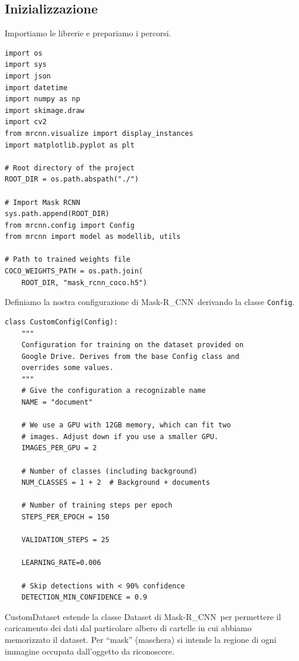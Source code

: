 \documentclass[12pt,a4paper]{article}
\newcommand{\mrcnn}{Mask-R\_CNN}
\begin{document}
\subsection{Inizializzazione}

Importiamo le librerie e prepariamo i percorsi.

\begin{verbatim}
import os
import sys
import json
import datetime
import numpy as np
import skimage.draw
import cv2
from mrcnn.visualize import display_instances
import matplotlib.pyplot as plt

# Root directory of the project
ROOT_DIR = os.path.abspath("./")

# Import Mask RCNN
sys.path.append(ROOT_DIR)
from mrcnn.config import Config
from mrcnn import model as modellib, utils

# Path to trained weights file
COCO_WEIGHTS_PATH = os.path.join(
    ROOT_DIR, "mask_rcnn_coco.h5")
\end{verbatim}

Definiamo la nostra configurazione di \mrcnn\ derivando la classe
\texttt{Config}.

\begin{verbatim}
class CustomConfig(Config):
    """
    Configuration for training on the dataset provided on
    Google Drive. Derives from the base Config class and
    overrides some values.
    """
    # Give the configuration a recognizable name
    NAME = "document"

    # We use a GPU with 12GB memory, which can fit two
    # images. Adjust down if you use a smaller GPU.
    IMAGES_PER_GPU = 2

    # Number of classes (including background)
    NUM_CLASSES = 1 + 2  # Background + documents

    # Number of training steps per epoch
    STEPS_PER_EPOCH = 150

    VALIDATION_STEPS = 25

    LEARNING_RATE=0.006

    # Skip detections with < 90% confidence
    DETECTION_MIN_CONFIDENCE = 0.9
\end{verbatim}

CustomDataset estende la classe Dataset di \mrcnn\ per
permettere il caricamento dei dati dal particolare albero di
cartelle in cui abbiamo memorizzato il dataset.
Per ``mask'' (maschera) si intende la regione di ogni
immagine occupata dall'oggetto da riconoscere.
\end{document}
